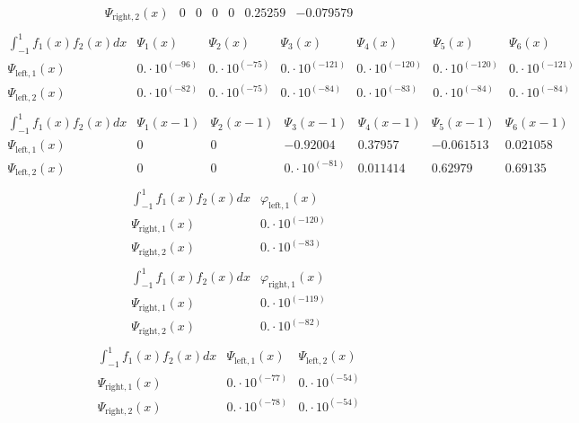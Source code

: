 \documentclass{article}
\begin{document}
\begin{landscape}
$$\begin{array}{l|llllll}
\Psi_{\text{right},2}(x) & 0 & 0 & 0 & 0 & 0.25259 & -0.079579 \\ 
\end{array} $$ 
$$ \begin{array}{l|llllll}
\int_{-1}^1 f_1(x)f_2(x) dx& \Psi_1(x)& \Psi_2(x)& \Psi_3(x)& \Psi_4(x)& \Psi_5(x)& \Psi_6(x) \\ \hline 
 \Psi_{\text{left},1}(x) & 0.\cdot 10^{(-96)} & 0.\cdot 10^{(-75)} & 0.\cdot 10^{(-121)} & 0.\cdot 10^{(-120)} & 0.\cdot 10^{(-120)} & 0.\cdot 10^{(-121)} \\ 
\Psi_{\text{left},2}(x) & 0.\cdot 10^{(-82)} & 0.\cdot 10^{(-75)} & 0.\cdot 10^{(-84)} & 0.\cdot 10^{(-83)} & 0.\cdot 10^{(-84)} & 0.\cdot 10^{(-84)} \\ 
\end{array} $$ 
$$ \begin{array}{l|llllll}
\int_{-1}^1 f_1(x)f_2(x) dx& \Psi_1(x-1)& \Psi_2(x-1)& \Psi_3(x-1)& \Psi_4(x-1)& \Psi_5(x-1)& \Psi_6(x-1) \\ \hline 
 \Psi_{\text{left},1}(x) & 0 & 0 & -0.92004 & 0.37957 & -0.061513 & 0.021058 \\ 
\Psi_{\text{left},2}(x) & 0 & 0 & 0.\cdot 10^{(-81)} & 0.011414 & 0.62979 & 0.69135 \\ 
\end{array} $$ 
$$ \begin{array}{l|l}
\int_{-1}^1 f_1(x)f_2(x) dx& \varphi_{\text{left},1}(x) \\ \hline 
 \Psi_{\text{right},1}(x) & 0.\cdot 10^{(-120)} \\ 
\Psi_{\text{right},2}(x) & 0.\cdot 10^{(-83)} \\ 
\end{array} $$ 
$$ \begin{array}{l|l}
\int_{-1}^1 f_1(x)f_2(x) dx& \varphi_{\text{right},1}(x) \\ \hline 
 \Psi_{\text{right},1}(x) & 0.\cdot 10^{(-119)} \\ 
\Psi_{\text{right},2}(x) & 0.\cdot 10^{(-82)} \\ 
\end{array} $$ 
$$ \begin{array}{l|ll}
\int_{-1}^1 f_1(x)f_2(x) dx& \Psi_{\text{left},1}(x)& \Psi_{\text{left},2}(x) \\ \hline 
 \Psi_{\text{right},1}(x) & 0.\cdot 10^{(-77)} & 0.\cdot 10^{(-54)} \\ 
\Psi_{\text{right},2}(x) & 0.\cdot 10^{(-78)} & 0.\cdot 10^{(-54)} \\ 
\end{array} $$ 
\end{landscape}
\end{document}
